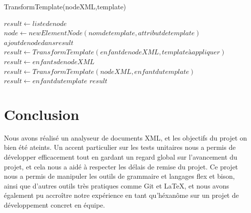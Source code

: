 \begin{algorithm}
\caption{TransformTemplate(nodeXML,template)}
\begin{algorithmic}
\STATE $result \leftarrow liste de node$
\STATE $node \leftarrow new ElementNode(nom de template,attribut de template)$
\STATE $ajout de node dans result$
\ENDIF
{}
\STATE $result \leftarrow TransformTemplate(enfant de nodeXML,template à appliquer)$
\ENDIF
{}
\STATE $result \leftarrow enfants de nodeXML$
\ENDIF
\ELSE
\STATE $result \leftarrow TransformTemplate(nodeXML,enfant du template)$
\ENDIF
\ELSE
\STATE $result \leftarrow enfant du template$
\ENDIF
\ENDFOR
\RETURN $result$
\end{algorithmic}
\end{algorithm}


\medskip
\section{Conclusion}

Nous avons réalisé un analyseur de documents XML, et les objectifs du projet on bien été ateints. Un accent particulier sur les tests unitaires nous a permis de développer efficacement tout en gardant un regard global sur l'avancement du projet, et cela nous a aidé à respecter les délais de remise du projet. Ce projet nous a permis de manipuler les outils de grammaire et langages flex et bison, ainsi que d'autres outils très pratiques comme Git et \LaTeX, et nous avons également pu accroître notre expérience en tant qu'héxanôme sur un projet de développement concret en équipe.
